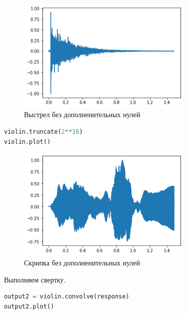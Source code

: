 \documentclass[a4paper,12pt]{report}
\begin{document}
    \begin{figure}[H]
        \centering
        \includegraphics[width=0.75\textwidth]{images/ex1_shot_3.png}
        \caption{Выстрел без дополненительных нулей}
        \label{fig:ex1_shot_3}
    \end{figure}
    
\begin{lstlisting}[language=Python,caption=Убираем нули в звуке скрипки]
violin.truncate(2**16)
violin.plot()
\end{lstlisting}

    \begin{figure}[H]
        \centering
        \includegraphics[width=0.75\textwidth]{images/ex1_violin_3.png}
        \caption{Скрипка без дополненительных нулей}
        \label{fig:ex1_violin_3}
    \end{figure}
    
    Выполняем свертку.
    
\begin{lstlisting}[language=Python,caption=Свертка]
output2 = violin.convolve(response)
output2.plot()
\end{lstlisting}
\end{document}
